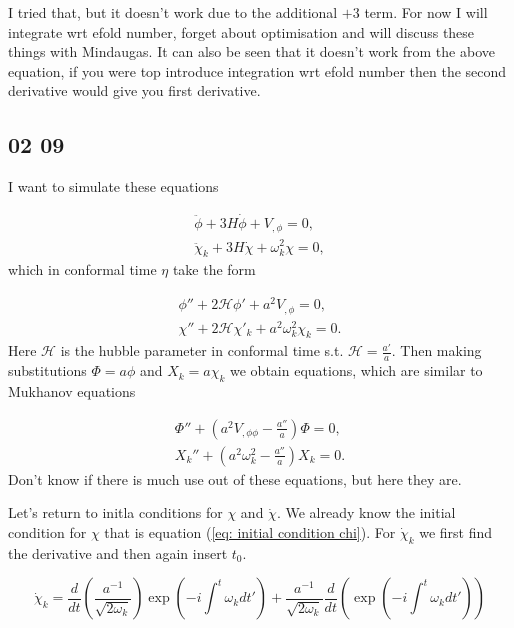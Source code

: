 I tried that, but it doesn't work due to the additional $+3$ term. For now I will integrate wrt efold number, forget about optimisation and will discuss these things with Mindaugas. It can also be seen that it doesn't work from the above equation, if you were top introduce integration wrt efold number then the second derivative would give you first derivative.


\subsection*{02 09}
I want to simulate these equations

\begin{align*}
    \ddot{\phi} + 3H \dot{\phi} + V_{, \phi} = 0, \\
    \ddot{\chi}_k + 3H \dot{\chi} + \omega^2_k \chi = 0,
\end{align*}
which in conformal time $\eta$ take the form

\begin{align}\label{eq: conformal time eom}
    \phi'' + 2 \mathcal{H} \phi' + a^2 V_{, \phi} = 0,\\
    \chi'' + 2 \mathcal{H} \chi'_k + a^2 \omega_k^2 \chi_k = 0.
\end{align}
Here $\mathcal{H}$ is the hubble parameter in conformal time s.t. $\mathcal{H} = \frac{a'}{a}$. Then making substitutions $\Phi = a \phi$ and $X_k = a \chi_k$ we obtain equations, which are similar to Mukhanov equations

\begin{align}\label{eq: conformal time mukhanoc}
    \Phi'' + \left( a^2 V_{, \phi \phi} - \frac{a''}{a} \right) \Phi = 0, \\
    X_k'' + \left( a^2 \omega_k^2 - \frac{a''}{a} \right) X_k = 0.
\end{align}
Don't know if there is much use out of these equations, but here they are.

Let's return to initla conditions for $\chi$ and $\dot{\chi}$. We already know the initial condition for $\chi$ that is equation (\ref{eq: initial condition chi}). For $\dot{\chi}_k$ we first find the derivative and then again insert $t_0$.

\begin{equation*}
    \dot{\chi}_k = \frac{d}{dt} \left( \frac{a^{-1}}{\sqrt{2 \omega_k}} \right) \exp \left( -i \int^t \omega_k dt' \right) + \frac{a^{-1}}{\sqrt{2 \omega_k}} \frac{d}{dt} \left( \exp \left( -i \int^t \omega_k dt' \right) \right)
\end{equation*}


